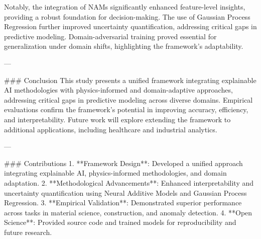 Notably, the integration of NAMs significantly enhanced feature-level insights, providing a robust foundation for decision-making. The use of Gaussian Process Regression further improved uncertainty quantification, addressing critical gaps in predictive modeling. Domain-adversarial training proved essential for generalization under domain shifts, highlighting the framework's adaptability.

---

### Conclusion
This study presents a unified framework integrating explainable AI methodologies with physics-informed and domain-adaptive approaches, addressing critical gaps in predictive modeling across diverse domains. Empirical evaluations confirm the framework's potential in improving accuracy, efficiency, and interpretability. Future work will explore extending the framework to additional applications, including healthcare and industrial analytics.

---

### Contributions
1. **Framework Design**: Developed a unified approach integrating explainable AI, physics-informed methodologies, and domain adaptation.
2. **Methodological Advancements**: Enhanced interpretability and uncertainty quantification using Neural Additive Models and Gaussian Process Regression.
3. **Empirical Validation**: Demonstrated superior performance across tasks in material science, construction, and anomaly detection.
4. **Open Science**: Provided source code and trained models for reproducibility and future research.